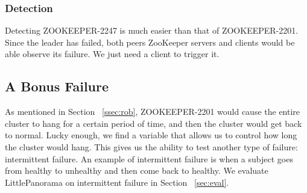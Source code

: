 \subsubsection{Detection}
Detecting ZOOKEEPER-2247 is much easier than that of ZOOKEEPER-2201. Since the leader has failed, both peers ZooKeeper servers and clients would be able observe its failure. We just need a client to trigger it.


\subsection{A Bonus Failure}
\label{subsec:intermittent}
As mentioned in Section ~\ref{ssec:rob}, ZOOKEEPER-2201 would cause the entire cluster to hang for a certain period of time, and then the cluster would get back to normal. Lucky enough, we find a variable that allows us to control how long the cluster would hang. This gives us the ability to test another type of failure: intermittent failure. An example of intermittent failure is when a subject goes from healthy to unhealthy and then come back to healthy. We evaluate LittlePanorama on intermittent failure in Section ~\ref{sec:eval}.






